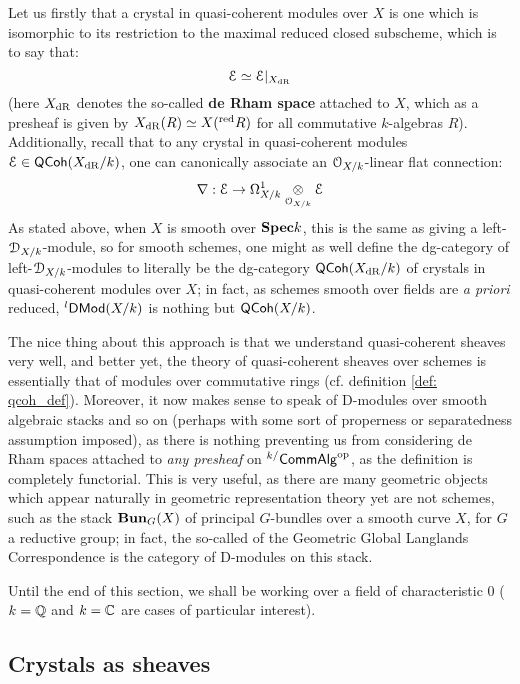             Let us firstly that a crystal in quasi-coherent modules over $X$ is one which is isomorphic to its restriction to the maximal reduced closed subscheme, which is to say that:
                $$\mathcal{E} \simeq \mathcal{E}|_{X_{\mathrm{dR}}}$$
            (here $X_{\mathrm{dR}}$ denotes the so-called \textbf{de Rham space} attached to $X$, which as a presheaf is given by $X_{\mathrm{dR}}(R) \simeq X({}^{\mathrm{red}}R)$ for all commutative $k$-algebras $R$). Additionally, recall that to any crystal in quasi-coherent modules $\mathcal{E} \in \mathsf{QCoh}(X_{\mathrm{dR}}/k)$, one can canonically associate an $\mathcal{O}_{X/k}$-linear flat connection:
                $$\nabla: \E \to \Omega^1_{X/k} \tensor_{\calO_{X/k}} \E$$
            As stated above, when $X$ is smooth over $\mathbf{Spec} k$, this is the same as giving a left-$\mathcal{D}_{X/k}$-module, so for smooth schemes, one might as well define the dg-category of left-$\mathcal{D}_{X/k}$-modules to literally be the dg-category $\mathsf{QCoh}(X_{\mathrm{dR}}/k)$ of crystals in quasi-coherent modules over $X$; in fact, as schemes smooth over fields are \textit{a priori} reduced, ${}^l\mathsf{DMod}(X/k)$ is nothing but $\mathsf{QCoh}(X/k)$.
            
            The nice thing about this approach is that we understand quasi-coherent sheaves very well, and better yet, the theory of quasi-coherent sheaves over schemes is essentially that of modules over commutative rings (cf. definition \ref{def: qcoh_def}). Moreover, it now makes sense to speak of D-modules over smooth algebraic stacks and so on (perhaps with some sort of properness or separatedness assumption imposed), as there is nothing preventing us from considering de Rham spaces attached to \textit{any presheaf} on ${}^{k/}\mathsf{Comm}\mathsf{Alg}^{\mathrm{op}}$, as the definition is completely functorial. This is very useful, as there are many geometric objects which appear naturally in geometric representation theory yet are not schemes, such as the stack $\mathbf{Bun}_G(X)$ of principal $G$-bundles over a smooth curve $X$, for $G$ a reductive group; in fact, the so-called  of the Geometric Global Langlands Correspondence is the category of D-modules on this stack.
        
        \begin{convention}
            Until the end of this section, we shall be working over a field of characteristic $0$ ($k = \mathbb{Q}$ and $k = \mathbb{C}$ are cases of particular interest).
        \end{convention}
    
        \subsection{Crystals as sheaves}
